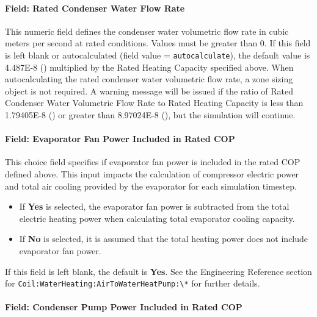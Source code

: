 \paragraph{Field: Rated Condenser Water Flow Rate}\label{vshpwhheating-rated-condenser-water-flow-rate}

This numeric field defines the condenser water volumetric flow rate in cubic meters per second at rated conditions. Values must be greater than 0.
If this field is left blank or autocalculated (field value = \lstinline!autocalculate!), the default value is \SI{4.487E-8}{\volumeFlowRateperWatt} () multiplied by the Rated Heating Capacity specified above.
When autocalculating the rated condenser water volumetric flow rate, a zone sizing object is not required.
A warning message will be issued if the ratio of Rated Condenser Water Volumetric Flow Rate to Rated Heating Capacity is less
than \SI{1.79405E-8}{\volumeFlowRateperWatt} ()
or greater than \SI{8.97024E-8}{\volumeFlowRateperWatt} (), but the simulation will continue.


\paragraph{Field: Evaporator Fan Power Included in Rated COP}\label{vshpwhheating-evaporator-fan-power-included-in-rated-cop}

This choice field specifies if evaporator fan power is included in the rated COP defined above.
This input impacts the calculation of compressor electric power and total air cooling provided by the evaporator for each simulation timestep.
\begin{itemize}
\item
    If \textbf{Yes} is selected, the evaporator fan power is subtracted from the total electric heating power when calculating total evaporator cooling capacity.
\item
    If \textbf{No} is selected, it is assumed that the total heating power does not include evaporator fan power.
\end{itemize}
If this field is left blank, the default is \textbf{Yes}. See the Engineering Reference section for \lstinline!Coil:WaterHeating:AirToWaterHeatPump:\*! for further details.


\paragraph{Field: Condenser Pump Power Included in Rated COP}\label{vshpwhheating-condenser-pump-power-included-in-rated-cop}

